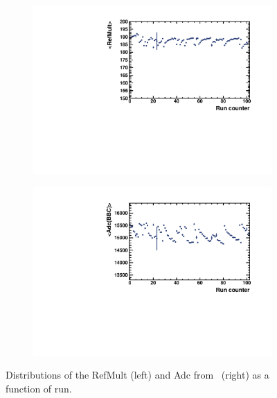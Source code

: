 \begin{figure}[ht]
    \begin{subfigure}{.49\textwidth}
        \centering
        \includegraphics[width=1.\linewidth]{Figures/RefMultVsRun.pdf}
    \end{subfigure}
    \begin{subfigure}{.49\textwidth}
        \centering
        \includegraphics[width=1.\linewidth]{Figures/AdcVsRun.pdf}
    \end{subfigure}
    \label{fig:RefMultAdcVsRun}
    \caption{Distributions of the RefMult (left) and Adc from \BBC\ (right) as a function of run.}
\end{figure}

